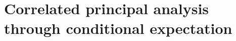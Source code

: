 
\chapter{Correlated principal analysis through conditional expectation \label{cha:cpace}}  %

\ifpdf
    \graphicspath{{Chapter5/Figs/Raster/}{Chapter5/Figs/PDF/}{Chapter5/Figs/}}
\else
    \graphicspath{{Chapter5/Figs/Vector/}{Chapter5/Figs/}}
\fi